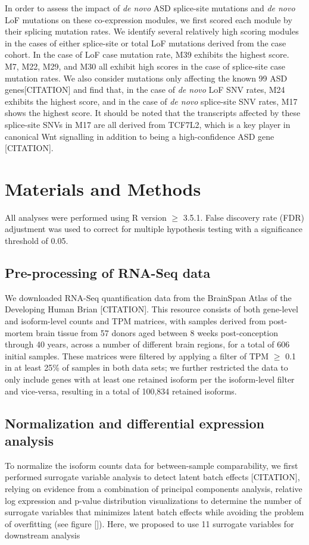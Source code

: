 In order to assess the impact of \textit{de novo} ASD splice-site mutations and \textit{de novo} LoF mutations on these co-expression modules, we first scored each module by their splicing mutation rates. We identify several relatively high scoring modules in the cases of either splice-site or total LoF mutations derived from the case cohort. In the case of LoF case mutation rate, M39 exhibits the highest score. M7, M22, M29, and M30 all exhibit high scores in the case of splice-site case mutation rates. We also consider mutations only affecting the known 99 ASD genes[CITATION] and find that, in the case of \textit{de novo} LoF SNV rates, M24 exhibits the highest score, and in the case of \textit{de novo} splice-site SNV rates, M17 shows the highest score. It should be noted that the transcripts affected by these splice-site SNVs in M17 are all derived from TCF7L2, which is a key player in canonical Wnt signalling in addition to being a high-confidence ASD gene [CITATION]. 

\section{Materials and Methods}
All analyses were performed using R version $\geq$ 3.5.1. False discovery rate (FDR) adjustment was used to correct for multiple hypothesis testing with a significance threshold of 0.05.

\subsection{Pre-processing of RNA-Seq data}
We downloaded RNA-Seq quantification data from the BrainSpan Atlas of the Developing Human Brian [CITATION]. This resource consists of both gene-level and isoform-level counts and TPM matrices, with samples derived from post-mortem brain tissue from 57 donors aged between 8 weeks post-conception through 40 years, across a number of different brain regions, for a total of 606 initial samples. These matrices were filtered by applying a filter of TPM $\geq$ 0.1 in at least 25\% of samples in both data sets; we further restricted the data to only include genes with at least one retained isoform per the isoform-level filter and vice-versa, resulting in a total of 100,834 retained isoforms.

\subsection{Normalization and differential expression analysis}
To normalize the isoform counts data for between-sample comparability, we first performed surrogate variable analysis to detect latent batch effects [CITATION], relying on evidence from a combination of principal components analysis, relative log expression and p-value distribution visualizations to determine the number of surrogate variables that minimizes latent batch effects while avoiding the problem of overfitting (see figure []). Here, we proposed to use 11 surrogate variables for downstream analysis\par

